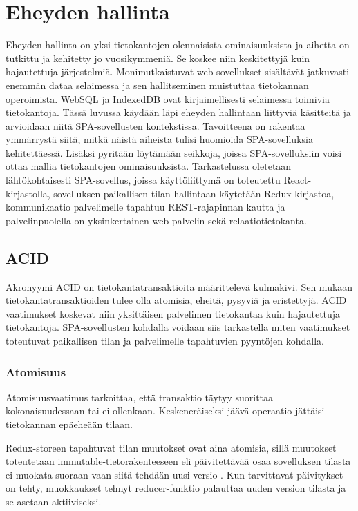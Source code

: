 \documentclass[finnish,twoside,censored,csm,sw-track-2018]{HYthesisML}
\begin{document}
\chapter{Eheyden hallinta}
\label{sec-eheydenhallinta-teoria}

Eheyden hallinta on yksi tietokantojen olennaisista ominaisuuksista ja aihetta on tutkittu ja kehitetty jo vuosikymmeniä. Se koskee niin keskitettyjä kuin hajautettuja järjestelmiä. Monimutkaistuvat web-sovellukset sisältävät jatkuvasti enemmän dataa selaimessa ja sen hallitseminen muistuttaa tietokannan operoimista. WebSQL ja IndexedDB ovat kirjaimellisesti selaimessa toimivia tietokantoja. Tässä luvussa käydään läpi eheyden hallintaan liittyviä käsitteitä ja arvioidaan niitä SPA-sovellusten kontekstissa. Tavoitteena on rakentaa ymmärrystä siitä, mitkä näistä aiheista tulisi huomioida SPA-sovelluksia kehitettäessä. Lisäksi pyritään löytämään seikkoja, joissa SPA-sovelluksiin voisi ottaa mallia tietokantojen ominaisuuksista. Tarkastelussa oletetaan lähtökohtaisesti SPA-sovellus, joissa käyttöliittymä on toteutettu React-kirjastolla, sovelluksen paikallisen tilan hallintaan käytetään Redux-kirjastoa, kommunikaatio palvelimelle tapahtuu REST-rajapinnan kautta ja palvelinpuolella on yksinkertainen web-palvelin sekä relaatiotietokanta.

\section{ACID}
\label{sec-acid}

Akronyymi ACID \citep{acid} on tietokantatransaktioita \citep{gray-1981} määrittelevä kulmakivi. Sen mukaan tietokantatransaktioiden tulee olla atomisia, eheitä, pysyviä ja eristettyjä. ACID vaatimukset koskevat niin yksittäisen palvelimen tietokantaa kuin hajautettuja tietokantoja. SPA-sovellusten kohdalla voidaan siis tarkastella miten vaatimukset toteutuvat paikallisen tilan ja palvelimelle tapahtuvien pyyntöjen kohdalla. 

\subsection{Atomisuus}

Atomisuusvaatimus tarkoittaa, että transaktio täytyy suorittaa kokonaisuudessaan tai ei ollenkaan. Keskeneräiseksi jäävä operaatio jättäisi tietokannan epäeheään tilaan.

Redux-storeen tapahtuvat tilan muutokset ovat aina atomisia, sillä muutokset toteutetaan immutable-tietorakenteeseen eli päivitettävää osaa sovelluksen tilasta ei muokata suoraan vaan siitä tehdään uusi versio \citep{redux-principles}. Kun tarvittavat päivitykset on tehty, muokkaukset tehnyt reducer-funktio palauttaa uuden version tilasta ja se asetaan aktiiviseksi.
\end{document}
